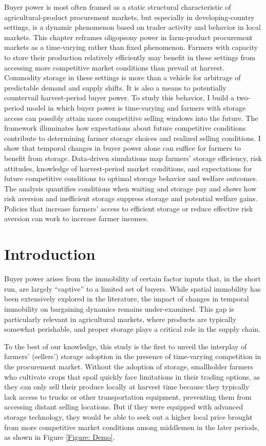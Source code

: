 \noindent
Buyer power is most often framed as a static structural characteristic of agricultural-product procurement markets, but especially in developing-country settings, is a dynamic phenomenon based on trader activity and behavior in local markets. This chapter reframes oligopsony power in farm-product procurement markets as a time-varying rather than fixed phenomenon. Farmers with capacity to store their production relatively efficiently may benefit in these settings from accessing more competitive market conditions than prevail at harvest. Commodity storage in these settings is more than a vehicle for arbitrage of predictable demand and supply shifts. It is also a means to potentially countervail harvest-period buyer power. To study this behavior, I build a two-period model in which buyer power is time-varying and farmers with storage access can possibly attain more competitive selling windows into the future. The framework illuminates how expectations about future competitive conditions contribute to determining farmer storage choices and realized selling conditions. I show that temporal changes in buyer power alone can suffice for farmers to benefit from storage. Data-driven simulations map farmers' storage efficiency, risk attitudes, knowledge of harvest-period market conditions, and expectations for future competitive conditions to optimal storage behavior and welfare outcomes. The analysis quantifies conditions when waiting and storage pay and shows how risk aversion and inefficient storage suppress storage and potential welfare gains. Policies that increase farmers' access to efficient storage or reduce effective risk aversion can work to increase farmer incomes.

\section{Introduction}
\noindent    
Buyer power arises from the immobility of certain factor inputs that, in the short run, are largely ``captive'' to a limited set of buyers. While spatial immobility has been extensively explored in the literature, the impact of changes in temporal immobility on bargaining dynamics remains under-examined. This gap is particularly relevant in agricultural markets, where products are typically somewhat perishable, and proper storage plays a critical role in the supply chain.


To the best of our knowledge, this study is the first to unveil the interplay of farmers' (sellers') storage adoption in the presence of time-varying competition in the procurement market. Without the adoption of storage, smallholder farmers who cultivate crops that spoil quickly face limitations in their trading options, as they can only sell their produce locally at harvest time because they typically lack access to trucks or other transportation equipment, preventing them from accessing distant selling locations. But if they were equipped with advanced storage technology, they would be able to seek out a higher local price brought from more competitive market conditions among middlemen in the later periods, as shown in Figure \ref{Figure: Demo}.

